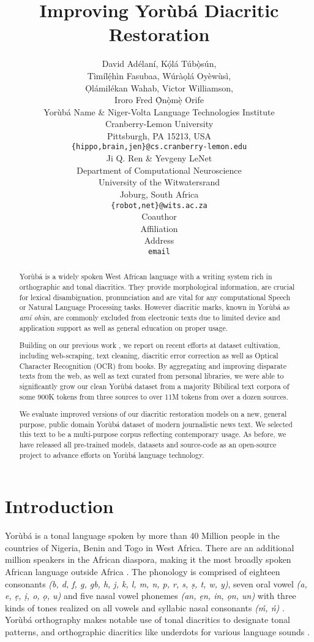 \documentclass{article} %
\title{Improving Yor{\`u}b{\'a} Diacritic Restoration}
\author{David Ad{\'e}lan{\'i}, K\d{\'{o}}l\'{a} T\'{u}b\d{\`{o}}s\'{u}n, \\ 
T{\`i}m{\'i}l\d{\'{e}}h{\`i}n Fasubaa, W{\'u}r{\`a}\d{o}l{\'a} Oy{\`e}w{\`u}s{\`i}, \\\d{O}l{\'a}mil{\'e}kan Wahab,  Victor Williamson, \\
		Iroro Fred \d{\`O}n\d{\`o}m\d{\`e} Orife \\
Yor{\`u}b{\'a} Name \& Niger-Volta Language Technologies Institute\\
Cranberry-Lemon University\\
Pittsburgh, PA 15213, USA \\
\texttt{\{hippo,brain,jen\}@cs.cranberry-lemon.edu} \\
\And
Ji Q. Ren \& Yevgeny LeNet \\
Department of Computational Neuroscience \\
University of the Witwatersrand \\
Joburg, South Africa \\
\texttt{\{robot,net\}@wits.ac.za} \\
\AND
Coauthor \\
Affiliation \\
Address \\
\texttt{email}
}
\begin{document}
\maketitle

\begin{abstract}
Yor{\`u}b{\'a} is a widely spoken West African language with a writing system rich in orthographic and tonal diacritics. They provide morphological information, are crucial for lexical disambiguation, pronunciation and are vital for any computational Speech or Natural Language Processing  tasks. However diacritic marks, known in Yor{\`u}b{\'a} as \emph{am{\'i} oh{\`u}n}, are commonly excluded from electronic texts due to limited device and application support as well as general education on proper usage.

Building on our previous work \citep{orife2018adr}, we report on recent efforts at dataset cultivation, including web-scraping, text cleaning, diacritic error correction as well as Optical Character Recognition (OCR) from books. By aggregating and improving disparate texts from the web, as well as text curated from personal libraries, we were able to significantly grow our clean Yor{\`u}b{\'a} dataset from a majority Bibilical text corpora of some 900K tokens from three sources to over 11M tokens from over a dozen sources. 
 
 We evaluate improved versions of our diacritic restoration models on a new, general purpose, public domain Yor{\`u}b{\'a} dataset of modern journalistic news text. We selected this text to be a multi-purpose corpus reflecting contemporary usage. As before, we have released all pre-trained models, datasets and source-code as an open-source project to advance efforts on Yor{\`u}b{\'a} language technology.\\
\end{abstract}

\section{Introduction}\label{sec:introduction}

Yor{\`u}b{\'a} is a tonal language spoken by more than 40 Million people in the countries of Nigeria, Benin and Togo in West Africa. There are an additional million speakers in the African diaspora, making it the most broadly spoken African language outside Africa \citep{yoruba_language}. The phonology is comprised of eighteen consonants \emph{({b}, {d}, {f}, {g}, {gb}, {h}, {j}, {k}, {l}, {m}, {n}, {p}, {r}, {s}, \d{s}, {t}, {w}, y)}, seven oral vowel \emph{({a}, {e}, \d{e}, \d{i}, {o}, \d{o}, {u})} and five nasal vowel phonemes \emph{({an}, \d{e}{n}, {in}, \d{o}{n}, {un})} with three kinds of tones realized on all vowels and syllabic nasal consonants \emph{({\'m}, {\'n})} \citep{akinlabi2004sound}. Yor{\`u}b{\'a} orthography makes notable use of tonal diacritics to designate tonal patterns, and orthographic diacritics like underdots for various language sounds \citep{adegbola2012quantifying, wells2000orthographic}.
\end{document}

